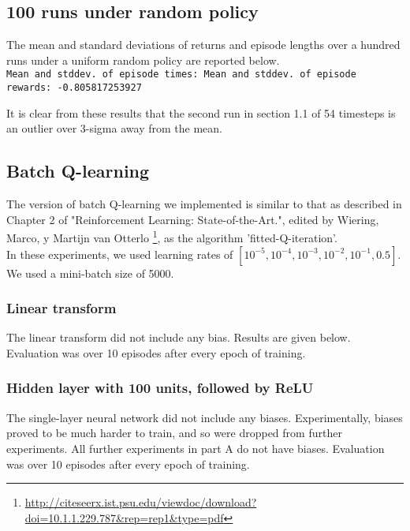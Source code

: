 \documentclass[paper=a4, fontsize=11pt]{scrartcl} %
\numberwithin{equation}{section} %
\numberwithin{figure}{section} %
\numberwithin{table}{section} %
\begin{document}
\subsection{100 runs under random policy}

The mean and standard deviations of returns and episode lengths over a hundred runs under a uniform random policy are reported below.\\

\texttt{Mean and stddev. of episode times: \quad\quad\quad\quad\quad{} \quad\quad{} \newline
Mean and stddev. of episode rewards: -0.805817253927 \quad\quad{} \newline
}

It is clear from these results that the second run in section 1.1 of 54 timesteps is an outlier over 3-sigma away from the mean.\\

\subsection{Batch Q-learning}

The version of batch Q-learning we implemented is similar to that as described in Chapter 2 of "Reinforcement Learning: State-of-the-Art.", edited by Wiering, Marco, y Martijn van Otterlo \footnote{\url{http://citeseerx.ist.psu.edu/viewdoc/download?doi=10.1.1.229.787&rep=rep1&type=pdf}}, as the algorithm 'fitted-Q-iteration'.\\

In these experiments, we used learning rates of $[10^{-5},10^{-4},10^{-3},10^{-2},10^{-1},0.5]$. We used a mini-batch size of 5000.\\

\subsubsection{Linear transform}

The linear transform did not include any bias. Results are given below. Evaluation was over 10 episodes after every epoch of training.

\subsubsection{Hidden layer with 100 units, followed by ReLU}

The single-layer neural network did not include any biases. Experimentally, biases proved to be much harder to train, and so were dropped from further experiments. All further experiments in part A do not have biases. Evaluation was over 10 episodes after every epoch of training.
\end{document}
